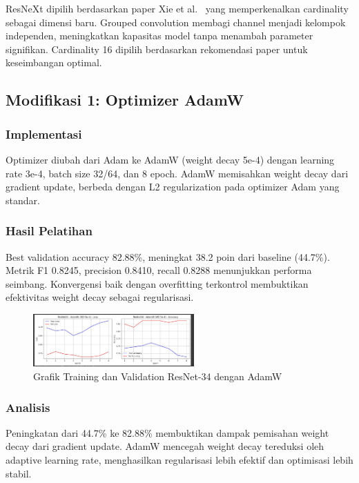 \documentclass[11pt,a4paper]{article}
\begin{document}
ResNeXt dipilih berdasarkan paper Xie et al.~\cite{xie2017aggregated} yang memperkenalkan cardinality sebagai dimensi baru. Grouped convolution membagi channel menjadi kelompok independen, meningkatkan kapasitas model tanpa menambah parameter signifikan. Cardinality 16 dipilih berdasarkan rekomendasi paper untuk keseimbangan optimal.

\subsection{Modifikasi 1: Optimizer AdamW}
\subsubsection{Implementasi}
Optimizer diubah dari Adam ke AdamW (weight decay 5e-4) dengan learning rate 3e-4, batch size 32/64, dan 8 epoch. AdamW memisahkan weight decay dari gradient update, berbeda dengan L2 regularization pada optimizer Adam yang standar.

\subsubsection{Hasil Pelatihan}
Best validation accuracy 82.88\%, meningkat 38.2 poin dari baseline (44.7\%). Metrik F1 0.8245, precision 0.8410, recall 0.8288 menunjukkan performa seimbang. Konvergensi baik dengan overfitting terkontrol membuktikan efektivitas weight decay sebagai regularisasi.

\begin{figure}[h]
\centering
\includegraphics[width=0.55\textwidth]{Figure/tahap-3-resnet34-adamw.jpg}
\caption{Grafik Training dan Validation ResNet-34 dengan AdamW}
\label{fig:resnet34-adamw}
\end{figure}

\subsubsection{Analisis}
Peningkatan dari 44.7\% ke 82.88\% membuktikan dampak pemisahan weight decay dari gradient update. AdamW mencegah weight decay tereduksi oleh adaptive learning rate, menghasilkan regularisasi lebih efektif dan optimisasi lebih stabil.
\end{document}
